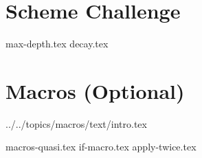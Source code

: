 \documentclass{exam}
\begin{document}
\newpage
\section{Scheme Challenge}
\begin{questions}
{max-depth.tex}
{decay.tex}
\end{questions}

\newpage
\section{Macros (Optional)}
 {../../topics/macros/text/}{intro.tex}
\begin{questions}
{macros-quasi.tex}
{if-macro.tex}
{apply-twice.tex}
\end{questions}

\end{document}
